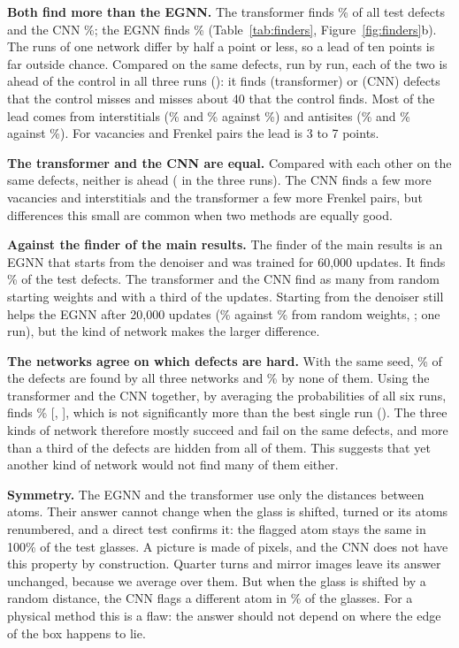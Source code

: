 \textbf{Both find more than the EGNN.} The transformer finds \% of all test defects and the CNN \%; the EGNN finds \% (Table~\ref{tab:finders}, Figure~\ref{fig:finders}b). The runs of one network differ by half a point or less, so a lead of ten points is far outside chance. Compared on the same defects, run by run, each of the two is ahead of the control in all three runs (): it finds  (transformer) or  (CNN) defects that the control misses and misses about 40 that the control finds. Most of the lead comes from interstitials (\% and \% against \%) and antisites (\% and \% against \%). For vacancies and Frenkel pairs the lead is 3 to 7 points.

\textbf{The transformer and the CNN are equal.} Compared with each other on the same defects, neither is ahead ( in the three runs). The CNN finds a few more vacancies and interstitials and the transformer a few more Frenkel pairs, but differences this small are common when two methods are equally good.

\textbf{Against the finder of the main results.} The finder of the main results is an EGNN that starts from the denoiser and was trained for 60,000 updates. It finds \% of the test defects. The transformer and the CNN find as many from random starting weights and with a third of the updates. Starting from the denoiser still helps the EGNN after 20,000 updates (\% against \% from random weights, ; one run), but the kind of network makes the larger difference.

\textbf{The networks agree on which defects are hard.} With the same seed, \% of the defects are found by all three networks and \% by none of them. Using the transformer and the CNN together, by averaging the probabilities of all six runs, finds \% {\small[, ]}, which is not significantly more than the best single run (). The three kinds of network therefore mostly succeed and fail on the same defects, and more than a third of the defects are hidden from all of them. This suggests that yet another kind of network would not find many of them either.

\textbf{Symmetry.} The EGNN and the transformer use only the distances between atoms. Their answer cannot change when the glass is shifted, turned or its atoms renumbered, and a direct test confirms it: the flagged atom stays the same in 100\% of the test glasses. A picture is made of pixels, and the CNN does not have this property by construction. Quarter turns and mirror images leave its answer unchanged, because we average over them. But when the glass is shifted by a random distance, the CNN flags a different atom in \% of the glasses. For a physical method this is a flaw: the answer should not depend on where the edge of the box happens to lie.

